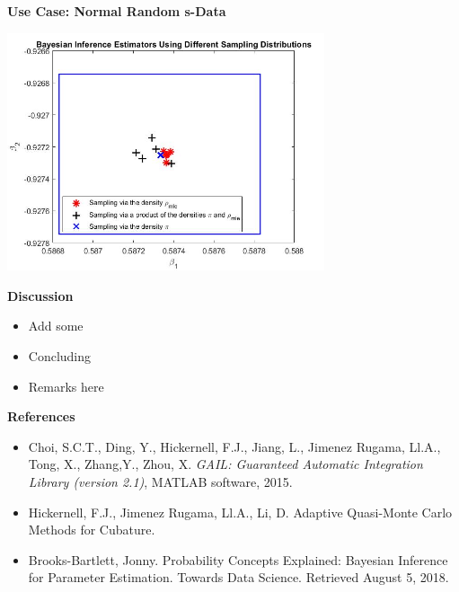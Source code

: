 \documentclass[final,mathserif]{beamer}
\newcommand{\blue}[1]{{\color{myblue}#1}}
\renewcommand{\blue}{\textcolor{blue!80!black}}
\begin{document}
\begin{frame}[fragile]
\begin{columns}[t]
\begin{column}{.31\linewidth}
\begin{block}{\Large \textbf{\blue {Use Case: Normal Random s-Data}}}
\begin{center}
\includegraphics[width=0.7\textwidth]{NormalRandom}
\end{center} 

\end{block}

\bigskip

\begin{block}{\Large \textbf{\blue {Discussion}}}

\vspace{.1in}

\begin{itemize}
\item Add some 

\item Concluding 

\item Remarks here
\end{itemize}

\end{block}

\bigskip

\begin{block}{\Large \textbf{\blue {References}}}

\vspace{.1in}
\begin{itemize}
\item Choi, S.C.T., Ding, Y., Hickernell, F.J., Jiang, L., Jimenez Rugama,
Ll.A., Tong, X., Zhang,Y., Zhou, X. \emph{{GAIL}:
  {G}uaranteed {A}utomatic {I}ntegration {L}ibrary (version 2.1)}, MATLAB
  software, 2015.

\item Hickernell, F.J., Jimenez Rugama, Ll.A., Li, D.
Adaptive Quasi-Monte Carlo Methods for Cubature.

\item Brooks-Bartlett, Jonny. Probability Concepts Explained: Bayesian Inference for Parameter Estimation. Towards Data Science. Retrieved August 5, 2018.
\end{itemize}
\end{block}


\end{column}
\end{columns}
\end{frame}
\end{document}
